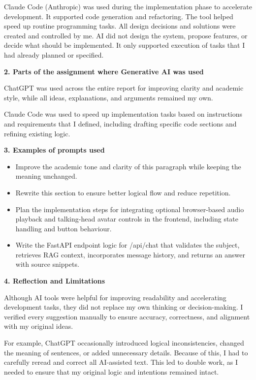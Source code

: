 \begin{appendices}
Claude Code (Anthropic) was used during the implementation phase to accelerate development. It supported code generation and refactoring. The tool helped speed up routine programming tasks. All design decisions and solutions were created and controlled by me. AI did not design the system, propose features, or decide what should be implemented. It only supported execution of tasks that I had already planned or specified.

\textbf{2. Parts of the assignment where Generative AI was used}

ChatGPT was used across the entire report for improving clarity and academic style, while all ideas, explanations, and arguments remained my own.

Claude Code was used to speed up implementation tasks based on instructions and requirements that I defined, including drafting specific code sections and refining existing logic.

\textbf{3. Examples of prompts used}
\begin{itemize}
    \item Improve the academic tone and clarity of this paragraph while keeping the meaning unchanged.
    \item Rewrite this section to ensure better logical flow and reduce repetition.
    \item Plan the implementation steps for integrating optional browser-based audio playback and talking-head avatar controls in the frontend, including state handling and button behaviour.
    \item Write the FastAPI endpoint logic for /api/chat that validates the subject, retrieves RAG context, incorporates message history, and returns an answer with source snippets.
\end{itemize}

\textbf{4. Reflection and Limitations}

Although AI tools were helpful for improving readability and accelerating development tasks, they did not replace my own thinking or decision-making. I verified every suggestion manually to ensure accuracy, correctness, and alignment with my original ideas.

For example, ChatGPT occasionally introduced logical inconsistencies, changed the meaning of sentences, or added unnecessary details. Because of this, I had to carefully reread and correct all AI-assisted text. This led to double work, as I needed to ensure that my original logic and intentions remained intact.


\end{appendices}
